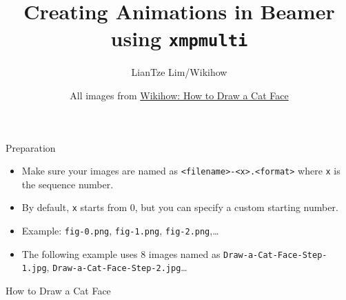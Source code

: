 \documentclass{beamer}
\title{Creating Animations in Beamer using \texttt{xmpmulti}}
\author{LianTze Lim/Wikihow}
\date[]{All images from \href{http://www.wikihow.com/Draw-a-Cat-Face}{Wikihow: How to Draw a Cat Face}}
\begin{document}
\begin{frame}
  \titlepage
\end{frame}

\begin{frame}{Preparation}
\begin{itemize}
\item Make sure your images are named as \texttt{<filename>-<x>.<format>} where \texttt{x} is the sequence number.
\item By default, \texttt{x} starts from 0, but you can specify a custom starting number.
\item Example: \texttt{fig-0.png}, \texttt{fig-1.png}, \texttt{fig-2.png},\ldots
\item The following example uses 8 images named as \texttt{Draw-a-Cat-Face-Step-1.jpg}, \texttt{Draw-a-Cat-Face-Step-2.jpg}\ldots
\end{itemize}
\end{frame}

\begin{frame}{How to Draw a Cat Face}
\end{frame}
\end{document}
